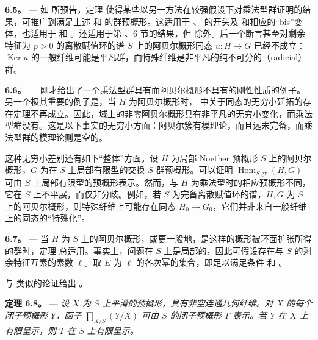 \medskip\noindent{}\textbf{6.5。} --- 如  所预告，定理  使得某些以另一方法在较强假设下对乘法型群证明的结果，可推广到满足上述  和  的群预概形。这适用于 、 的开头及  和相应的“bis”变体，也适用于  和 。还适用于第 、6 节的结果，但  除外。后一个断言甚至对剩余特征为 \(p>0\) 的离散赋值环的谱 \(S\) 上的阿贝尔概形同态 \(u:H\to G\) 已经不成立：\(\operatorname{Ker}u\) 的一般纤维可能是平凡群，而特殊纤维是非平凡的纯不可分的（radicial）群。

\medskip\noindent{}\textbf{6.6。} --- 刚才给出了一个乘法型群具有而阿贝尔概形不具有的刚性性质的例子。另一个极其重要的例子是，当 \(H\) 为阿贝尔概形时， 中关于同态的无穷小延拓的存在定理不再成立。因此，域上的非零阿贝尔概形具有非平凡的无穷小变化，而乘法型群没有。这是以下事实的无穷小方面：阿贝尔簇有模理论，而且远未完备，而乘法型群的模理论则是空的。

这种无穷小差别还有如下“整体”方面。设 \(H\) 为局部 Noether 预概形 \(S\) 上的阿贝尔概形，\(G\) 为在 \(S\) 上局部有限型的交换 \(S\)-群预概形。可以证明 \(\operatorname{Hom}_{S\text{-}\mathrm{gr}}(H,G)\) 可由 \(S\) 上局部有限型的预概形表示。然而，与 \(H\) 为乘法型时的相应预概形不同，它在 \(S\) 上不平展，而仅非分歧。例如，若 \(S\) 为完备离散赋值环的谱，\(H,G\) 为 \(S\) 上的阿贝尔概形，则特殊纤维上可能存在同态 \(H_0\to G_0\)，它们并非来自一般纤维上的同态的“特殊化”。

\medskip\noindent{}\textbf{6.7。} --- 当 \(H\) 为 \(S\) 上的阿贝尔概形，或更一般地，是这样的概形被环面扩张所得的群时，定理  总适用。事实上，问题在 \(S\) 上是局部的，因此可假设存在与 \(S\) 的剩余特征互素的素数 \(\ell\)。取 \(E\) 为 \(\ell\) 的各次幂的集合，即足以满足条件  和 。

与  类似的论证给出 。

\medskip\noindent{}\textbf{定理 6.8。} --- \textit{设 \(X\) 为 \(S\) 上平滑的预概形，具有非空连通几何纤维。对 \(X\) 的每个闭子预概形 \(Y\)，函子 \(\prod_{X/S}(Y/X)\) 可由 \(S\) 的闭子预概形 \(T\) 表示。若 \(Y\) 在 \(X\) 上有限呈示，则 \(T\) 在 \(S\) 上有限呈示。}

